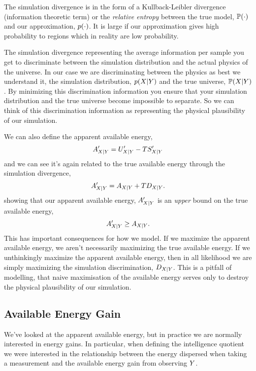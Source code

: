 \documentclass[]{article}
\begin{document}
The simulation divergence is in the form of a Kullback-Leibler
divergence (information theoretic term) or the \emph{relative entropy}
between the true model, \(\mathbb{P}(\cdot)\) and our approximation,
\(p(\cdot)\). It is large if our approximation gives high
probability to regions which in reality are low probability.

The simulation divergence representing the average information per sample you get to discriminate between the simulation distribution and the actual physics of the universe. In our case we are discriminating between the physics as best we understand it, the simulation distribution, $p(X|Y)$ and the true universe, $\mathbb{P}(X | Y)$. By minimizing this discrimination information you ensure that your simulation distribution and the true universe become impossible to separate. So we can think of this discrimination information as representing the physical plausibility of our simulation. 

We can also define the apparent available energy, 
\[
A^\prime_{X|Y} = U^\prime_{X|Y} - TS^\prime_{X|Y}
\] 
and we can see it's again related to the true available energy through the
simulation divergence, 
\[
A^\prime_{X|Y} = A_{X|Y} + TD_{X|Y}.
\] 
showing that our apparent available energy,
\(A^\prime_{X|Y}\) is an \emph{upper} bound
on the true available energy, 
\[
A^\prime_{X|Y} \geq A_{X|Y}.
\]
This has important consequences for how we model. If we maximize the
apparent available energy, we aren't necessarily maximizing the true
available energy. If we unthinkingly maximize the apparent available energy, then in all likelihood we are simply maximizing the simulation discrimination, $D_{X | Y}$. This is a pitfall of modelling, that naive maximisation of the available energy serves only to destroy the physical plausibility of our simulation.

\subsection{Available Energy Gain}

We've looked at the apparent available energy, but in practice we are normally interested in energy gains. In particular, when defining the intelligence quotient we were interested in the relationship between the energy dispersed when taking a measurement and the available energy gain from observing $Y$. 
\end{document}
